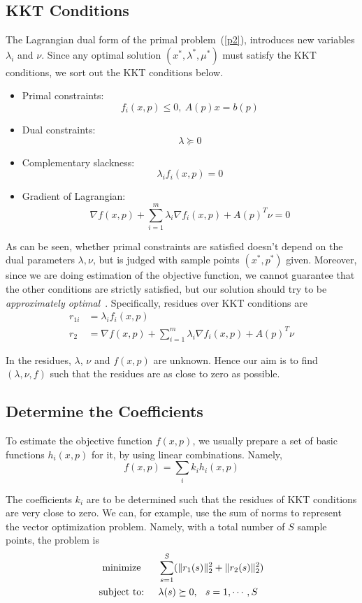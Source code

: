 \subsection{KKT Conditions}

The Lagrangian dual form of the primal problem~(\ref{p2}), introduces new variables $\lambda_i$ and $\nu$. Since any optimal solution $(x^*,\lambda^*,\mu^*)$ must satisfy the KKT conditions, we sort out the KKT conditions below.

\begin{itemize}
\item Primal constraints: \[f_i(x,p)\le0,\ A(p)x=b(p)\]
\item Dual constraints: \[\lambda\succeq0\]
\item Complementary slackness: \[\lambda_if_i(x,p)=0\]
\item Gradient of Lagrangian: \[\nabla f(x,p)+\sum_{i=1}^m\lambda_i\nabla f_i(x,p)+A(p)^T\nu=0\]
\end{itemize}

As can be seen, whether primal constraints are satisfied doesn't depend on the dual parameters $\lambda,\nu$, but is judged with sample points $(x^*,p^*)$ given. Moreover, since we are doing estimation of the objective function, we cannot guarantee that the other conditions are strictly satisfied, but our solution should try to be \textit{approximately optimal}~\cite{keshavarz2011}. Specifically, residues over KKT conditions are
\begin{align}
r_{1i}&=\lambda_if_i(x,p)\\
r_2&=\nabla f(x,p)+\sum_{i=1}^m\lambda_i\nabla f_i(x,p)+A(p)^T\nu
\end{align}

In the residues, $\lambda$, $\nu$ and $f(x,p)$ are unknown. Hence our aim is to find $(\lambda,\nu,f)$ such that the residues are as close to zero as possible.

\subsection{Determine the Coefficients}

To estimate the objective function $f(x,p)$, we usually prepare a set of basic functions $h_i(x,p)$ for it, by using linear combinations. Namely,
\[f(x,p)=\sum_ik_ih_i(x,p)\]

The coefficients $k_i$ are to be determined such that the residues of KKT conditions are very close to zero. We can, for example, use the sum of norms to represent the vector optimization problem. Namely, with a total number of $S$ sample points, the problem is
\begin{align}
\begin{split}\label{p3}
\textrm{minimize }\hspace{.2in}&\sum_{s=1}^S(\|r_1(s)\|_2^2+\|r_2(s)\|_2^2)\\
\textrm{subject to:}\hspace{.2in}&\lambda(s)\succeq0,\hspace{.1in}s=1,\cdots,S
\end{split}
\end{align}

